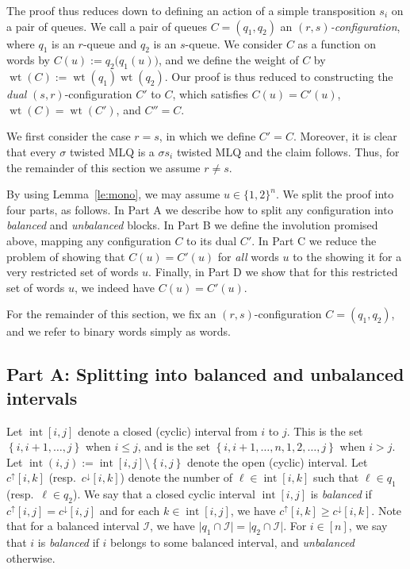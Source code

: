 \documentclass[reqno]{amsart}
\newcommand{\0}{\phantom{c}}
\DeclareMathOperator{\inter}{int} %
\DeclareMathOperator{\wt}{wt} %
\newcommand{\mcI}{\mathcal{I}}
\newcommand{\set}[1]{\left\{ #1 \right\}}
\newcommand{\ive}[1]{\left[ #1 \right]}
\newcommand{\defn}[1]{{\color{darkred}\emph{#1}}} %
\theoremstyle{plain}
\theoremstyle{definition}
\numberwithin{equation}{section}
\begin{document}
The proof thus reduces down to defining an action of a simple transposition $s_i$ on a pair of queues.
We call a pair of queues $C = (q_1, q_2)$ an \defn{$(r,s)$-configuration}, where $q_1$ is an $r$-queue and $q_2$ is an $s$-queue.
We consider $C$ as a function on words by $C(u) := q_2\bigr(q_1(u)\bigr)$, and we define the weight of $C$ by $\wt(C) := \wt(q_1) \wt(q_2)$.
Our proof is thus reduced to constructing the \defn{dual} $(s,r)$-configuration $C'$ to $C$, which satisfies $C(u) = C'(u)$, $\wt(C) = \wt(C')$, and $C'' = C$.

We first consider the case $r = s$, in which we define $C' = C$.
Moreover, it is clear that every $\sigma$ twisted MLQ is a $\sigma s_i$ twisted MLQ and the claim follows.
Thus, for the remainder of this section we assume $r \neq s$.

By using Lemma~\ref{le:mono}, we may assume $u \in \{1,2\}^n$.
We split the proof into four parts, as follows.
In Part A we describe how to split any configuration into \defn{balanced} and \defn{unbalanced} blocks. In Part B we define the involution promised above, mapping any configuration $C$ to its dual $C'$.
In Part C we reduce the problem of showing that $C(u) = C'(u)$ for \emph{all} words $u$ to the showing it for a very restricted set of words $u$.
Finally, in Part D we show that for this restricted set of words $u$, we indeed have $C(u) = C'(u)$.

For the remainder of this section, we fix an $(r,s)$-configuration $C = (q_1, q_2)$, and we refer to binary words simply as words.

\subsection*{Part A: Splitting into balanced and unbalanced intervals}

Let $\inter[i,j]$ denote a closed (cyclic) interval from $i$ to $j$.
This is the set $\set{i, i+1, \ldots, j}$ when $i \leq j$, and is the set $\set{i, i+1, \ldots, n, 1, 2, \ldots, j}$ when $i > j$.
Let $\inter(i,j) := \inter[i,j] \setminus \set{i,j}$ denote the open (cyclic) interval.
Let $c^{\uparrow}[i,k]$ (resp.~$c^{\downarrow}[i,k]$) denote the number of $\ell \in \inter[i,k]$ such that $\ell \in q_1$ (resp.~$\ell \in q_2$).
We say that a closed cyclic interval $\inter[i,j]$ is \defn{balanced} if $c^{\uparrow}[i,j] = c^{\downarrow}[i,j]$ and for each $k \in \inter[i,j]$, we have $c^\uparrow[i,k] \geq c^\downarrow[i,k]$.
Note that for a balanced interval $\mcI$, we have $\lvert q_1 \cap \mcI \rvert = \lvert q_2 \cap \mcI \rvert$.
For $i \in \ive{n}$, we say that $i$ is \defn{balanced} if $i$ belongs to some balanced interval, and \defn{unbalanced} otherwise.
\end{document}
